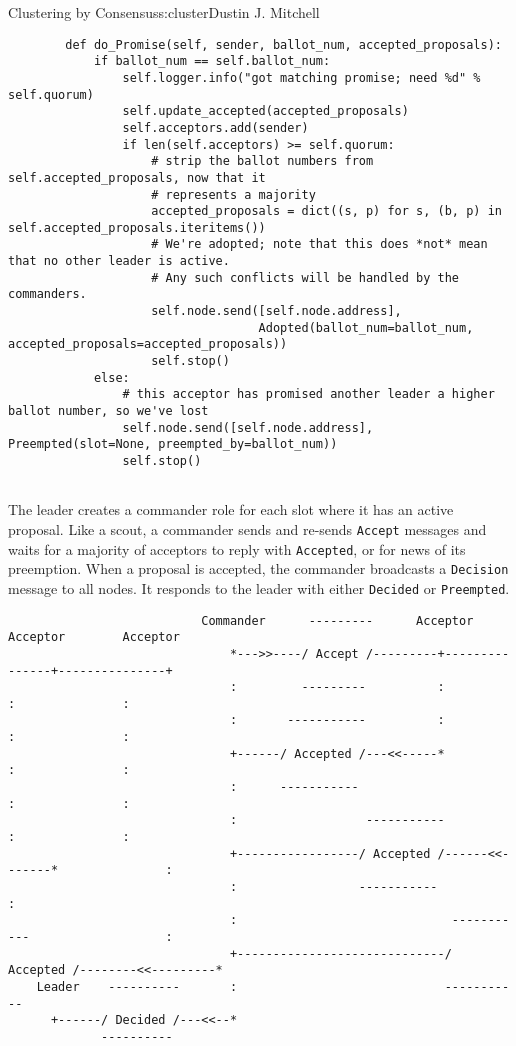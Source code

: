 \begin{aosachapter}{Clustering by Consensus}{s:cluster}{Dustin J. Mitchell}
\begin{verbatim}
        def do_Promise(self, sender, ballot_num, accepted_proposals):
            if ballot_num == self.ballot_num:
                self.logger.info("got matching promise; need %d" % self.quorum)
                self.update_accepted(accepted_proposals)
                self.acceptors.add(sender)
                if len(self.acceptors) >= self.quorum:
                    # strip the ballot numbers from self.accepted_proposals, now that it
                    # represents a majority
                    accepted_proposals = dict((s, p) for s, (b, p) in self.accepted_proposals.iteritems())
                    # We're adopted; note that this does *not* mean that no other leader is active.
                    # Any such conflicts will be handled by the commanders.
                    self.node.send([self.node.address],
                                   Adopted(ballot_num=ballot_num, accepted_proposals=accepted_proposals))
                    self.stop()
            else:
                # this acceptor has promised another leader a higher ballot number, so we've lost
                self.node.send([self.node.address], Preempted(slot=None, preempted_by=ballot_num))
                self.stop()
    
\end{verbatim}

The leader creates a commander role for each slot where it has an active
proposal. Like a scout, a commander sends and re-sends \texttt{Accept}
messages and waits for a majority of acceptors to reply with
\texttt{Accepted}, or for news of its preemption. When a proposal is
accepted, the commander broadcasts a \texttt{Decision} message to all
nodes. It responds to the leader with either \texttt{Decided} or
\texttt{Preempted}.

\begin{verbatim}
                           Commander      ---------      Acceptor        Acceptor        Acceptor
                               *--->>----/ Accept /---------+---------------+---------------+
                               :         ---------          :               :               :
                               :       -----------          :               :               :
                               +------/ Accepted /---<<-----*               :               :
                               :      -----------                           :               :
                               :                  -----------               :               :
                               +-----------------/ Accepted /------<<-------*               :
                               :                 -----------                                :
                               :                              -----------                   :
                               +-----------------------------/ Accepted /--------<<---------*
    Leader    ----------       :                             -----------
      +------/ Decided /---<<--*
             ----------   
\end{verbatim}


\end{aosachapter}
